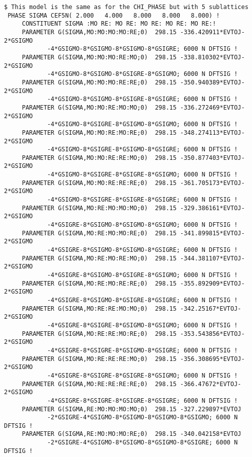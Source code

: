 \documentclass[12pt]{article}
\begin{document}
{\begin{verbatim}
$ This model is the same as for the CHI_PHASE but with 5 sublattices
 PHASE SIGMA CEF5N( 2.000   4.000   8.000   8.000   8.000) !
     CONSTITUENT SIGMA :MO RE: MO RE: MO RE: MO RE: MO RE:!
     PARAMETER G(SIGMA,MO:MO:MO:MO:RE;0)  298.15 -336.420911*EVTOJ-2*GSIGMO
            -4*GSIGMO-8*GSIGMO-8*GSIGMO-8*GSIGRE; 6000 N DFTSIG !
     PARAMETER G(SIGMA,MO:MO:MO:RE:MO;0)  298.15 -338.810302*EVTOJ-2*GSIGMO
            -4*GSIGMO-8*GSIGMO-8*GSIGRE-8*GSIGMO; 6000 N DFTSIG !
     PARAMETER G(SIGMA,MO:MO:MO:RE:RE;0)  298.15 -350.940389*EVTOJ-2*GSIGMO
            -4*GSIGMO-8*GSIGMO-8*GSIGRE-8*GSIGRE; 6000 N DFTSIG !
     PARAMETER G(SIGMA,MO:MO:RE:MO:MO;0)  298.15 -336.272469*EVTOJ-2*GSIGMO
            -4*GSIGMO-8*GSIGRE-8*GSIGMO-8*GSIGMO; 6000 N DFTSIG !
     PARAMETER G(SIGMA,MO:MO:RE:MO:RE;0)  298.15 -348.274113*EVTOJ-2*GSIGMO
            -4*GSIGMO-8*GSIGRE-8*GSIGMO-8*GSIGRE; 6000 N DFTSIG !
     PARAMETER G(SIGMA,MO:MO:RE:RE:MO;0)  298.15 -350.877403*EVTOJ-2*GSIGMO
            -4*GSIGMO-8*GSIGRE-8*GSIGRE-8*GSIGMO; 6000 N DFTSIG !
     PARAMETER G(SIGMA,MO:MO:RE:RE:RE;0)  298.15 -361.705173*EVTOJ-2*GSIGMO
            -4*GSIGMO-8*GSIGRE-8*GSIGRE-8*GSIGRE; 6000 N DFTSIG !
     PARAMETER G(SIGMA,MO:RE:MO:MO:MO;0)  298.15 -329.386161*EVTOJ-2*GSIGMO
            -4*GSIGRE-8*GSIGMO-8*GSIGMO-8*GSIGMO; 6000 N DFTSIG !
     PARAMETER G(SIGMA,MO:RE:MO:MO:RE;0)  298.15 -341.899815*EVTOJ-2*GSIGMO
            -4*GSIGRE-8*GSIGMO-8*GSIGMO-8*GSIGRE; 6000 N DFTSIG !
     PARAMETER G(SIGMA,MO:RE:MO:RE:MO;0)  298.15 -344.381107*EVTOJ-2*GSIGMO
            -4*GSIGRE-8*GSIGMO-8*GSIGRE-8*GSIGMO; 6000 N DFTSIG !
     PARAMETER G(SIGMA,MO:RE:MO:RE:RE;0)  298.15 -355.892909*EVTOJ-2*GSIGMO
            -4*GSIGRE-8*GSIGMO-8*GSIGRE-8*GSIGRE; 6000 N DFTSIG !
     PARAMETER G(SIGMA,MO:RE:RE:MO:MO;0)  298.15 -342.25167*EVTOJ-2*GSIGMO
            -4*GSIGRE-8*GSIGRE-8*GSIGMO-8*GSIGMO; 6000 N DFTSIG !
     PARAMETER G(SIGMA,MO:RE:RE:MO:RE;0)  298.15 -353.543856*EVTOJ-2*GSIGMO
            -4*GSIGRE-8*GSIGRE-8*GSIGMO-8*GSIGRE; 6000 N DFTSIG !
     PARAMETER G(SIGMA,MO:RE:RE:RE:MO;0)  298.15 -356.308695*EVTOJ-2*GSIGMO
            -4*GSIGRE-8*GSIGRE-8*GSIGRE-8*GSIGMO; 6000 N DFTSIG !
     PARAMETER G(SIGMA,MO:RE:RE:RE:RE;0)  298.15 -366.47672*EVTOJ-2*GSIGMO
            -4*GSIGRE-8*GSIGRE-8*GSIGRE-8*GSIGRE; 6000 N DFTSIG !
     PARAMETER G(SIGMA,RE:MO:MO:MO:MO;0)  298.15 -327.229897*EVTOJ
            -2*GSIGRE-4*GSIGMO-8*GSIGMO-8*GSIGMO-8*GSIGMO; 6000 N DFTSIG !
     PARAMETER G(SIGMA,RE:MO:MO:MO:RE;0)  298.15 -340.042158*EVTOJ
            -2*GSIGRE-4*GSIGMO-8*GSIGMO-8*GSIGMO-8*GSIGRE; 6000 N DFTSIG !

\end{verbatim}}
\end{document}
